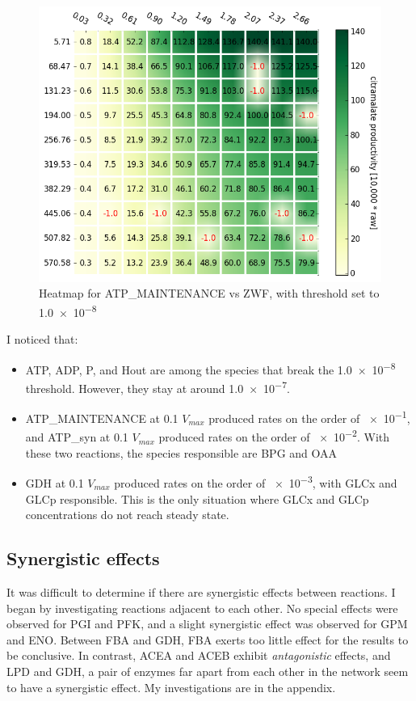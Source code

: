 \documentclass[parskip=full]{scrreprt}
\begin{document}
\begin{figure}[htbp]
  \centering
  \includegraphics[scale=0.5]{steadystate}
  \caption{Heatmap for ATP\_MAINTENANCE vs ZWF, with threshold set to \num{1.0e-8}}
  \label{fig:steadystate}
\end{figure}

I noticed that:
\begin{itemize}
  \item ATP, ADP, P, and Hout are among the species that break the \num{1.0e-8} threshold. However, they stay at around \num{1.0e-7}.
  \item ATP\_MAINTENANCE at 0.1 $V_{max}$ produced rates on the order of \num{e-1}, and ATP\_syn at 0.1 $V_{max}$ produced rates on the order of \num{e-2}. With these two reactions, the species responsible are BPG and OAA
  \item GDH at 0.1 $V_{max}$ produced rates on the order of \num{e-3}, with GLCx and GLCp responsible. This is the only situation where GLCx and GLCp concentrations do not reach steady state.
\end{itemize}

\subsection{Synergistic effects}
\label{ssec:synergistic}

It was difficult to determine if there are synergistic effects between reactions. I began by investigating reactions adjacent to each other. No special effects were observed for PGI and PFK, and a slight synergistic effect was observed for GPM and ENO. Between FBA and GDH, FBA exerts too little effect for the results to be conclusive. In contrast, ACEA and ACEB exhibit \emph{antagonistic} effects, and LPD and GDH, a pair of enzymes far apart from each other in the network seem to have a synergistic effect. My investigations are in the appendix. %
\end{document}
